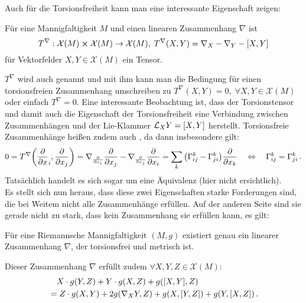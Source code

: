 \documentclass[../H_Analysis_main.tex]{subfiles}
\begin{document}
Auch für die Torsionsfreiheit kann man eine interessante Eigenschaft zeigen:
\begin{lemma}[Torsionstensor]
Für eine Mannigfaltigkeit $M$ und einen linearen Zusammenhang $\nabla$ ist
\begin{equation}
T^\nabla: \mathcal{X}(M) \cross \mathcal{X}(M) \rightarrow \mathcal{X}(M), \; T^\nabla(X, Y) = \nabla_X - \nabla_Y - \qty[X, Y]
\end{equation}
für Vektorfelder $X, Y \in \mathcal{X}(M)$ ein Tensor.
\end{lemma}
$T^\nabla$ wird auch  genannt und mit ihm kann man die Bedingung für einen torsionsfreien Zusammenhang umschreiben zu $T^\nabla(X, Y) = 0, \; \forall X, Y \in \mathcal{X}(M)$ oder einfach $T^\nabla = 0$. Eine interessante Beobachtung ist, dass der Torsionstensor und damit auch die Eigenschaft der Torsionsfreiheit eine Verbindung zwischen Zusammenhängen und der Lie-Klammer $\mathcal{L}_X Y = \qty[X, Y]$ herstellt. Torsionsfreie Zusammenhänge heißen zudem auch , da dann insbesondere gilt:
\begin{equation}
0 = T^\nabla\qty(\pdv{x}_i, \pdv{x_j}) = \nabla_{\pdv{x_i}} \pdv{x_j} - \nabla_{\pdv{x_j}} \pdv{x_i} = \sum_k \qty(\Gamma_{ij}^k - \Gamma_{ji}^k) \pdv{x_k} \quad \Leftrightarrow \quad \Gamma_{ij}^k = \Gamma_{ji}^k \, .
\end{equation}
Tatsächlich handelt es sich sogar um eine Äquivalenz (hier nicht ersichtlich).\\


Es stellt sich nun heraus, dass diese zwei Eigenschaften starke Forderungen sind, die bei Weitem nicht alle Zusammenhänge erfüllen. Auf der anderen Seite sind sie gerade nicht zu stark, dass kein Zusammenhang sie erfüllen kann, es gilt:
\begin{satz}
Für eine Riemannsche Mannigfaltigkeit $(M, g)$ existiert genau ein linearer Zusammenhang $\nabla$, der torsionsfrei und metrisch ist.

Dieser Zusammenhang $\nabla$ erfüllt zudem $\forall X, Y, Z \in \mathcal{X}(M)$:
\begin{equation}\label{eq:koszul}
\begin{split}
& \quad X \cdot g(Y, Z) + Y \cdot g(X, Z) + g\qty([X, Y], Z) 
\\
&= Z \cdot g(X, Y) + 2 g\qty(\nabla_X Y, Z) + g\qty(X, [Y, Z]) + g\qty(Y, [X, Z]) \, .
\end{split}
\end{equation}
\end{satz}
\end{document}
